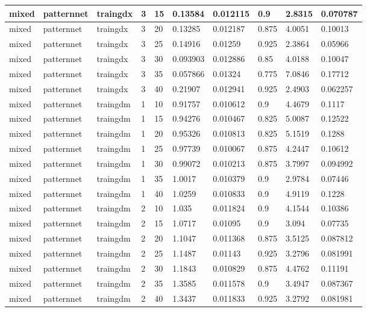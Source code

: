 \begin{longtable}{lllllllll}
mixed & patternnet & traingdx & 3 & 15 & 0.13584 & 0.012115 & 0.9 & 2.8315 & 0.070787 \\ \hline 
mixed & patternnet & traingdx & 3 & 20 & 0.13285 & 0.012187 & 0.875 & 4.0051 & 0.10013 \\ \hline 
mixed & patternnet & traingdx & 3 & 25 & 0.14916 & 0.01259 & 0.925 & 2.3864 & 0.05966 \\ \hline 
mixed & patternnet & traingdx & 3 & 30 & 0.093903 & 0.012886 & 0.85 & 4.0188 & 0.10047 \\ \hline 
mixed & patternnet & traingdx & 3 & 35 & 0.057866 & 0.01324 & 0.775 & 7.0846 & 0.17712 \\ \hline 
mixed & patternnet & traingdx & 3 & 40 & 0.21907 & 0.012941 & 0.925 & 2.4903 & 0.062257 \\ \hline 
mixed & patternnet & traingdm & 1 & 10 & 0.91757 & 0.010612 & 0.9 & 4.4679 & 0.1117 \\ \hline 
mixed & patternnet & traingdm & 1 & 15 & 0.94276 & 0.010467 & 0.825 & 5.0087 & 0.12522 \\ \hline 
mixed & patternnet & traingdm & 1 & 20 & 0.95326 & 0.010813 & 0.825 & 5.1519 & 0.1288 \\ \hline 
mixed & patternnet & traingdm & 1 & 25 & 0.97739 & 0.010067 & 0.875 & 4.2447 & 0.10612 \\ \hline 
mixed & patternnet & traingdm & 1 & 30 & 0.99072 & 0.010213 & 0.875 & 3.7997 & 0.094992 \\ \hline 
mixed & patternnet & traingdm & 1 & 35 & 1.0017 & 0.010379 & 0.9 & 2.9784 & 0.07446 \\ \hline 
mixed & patternnet & traingdm & 1 & 40 & 1.0259 & 0.010833 & 0.9 & 4.9119 & 0.1228 \\ \hline 
mixed & patternnet & traingdm & 2 & 10 & 1.035 & 0.011824 & 0.9 & 4.1544 & 0.10386 \\ \hline 
mixed & patternnet & traingdm & 2 & 15 & 1.0717 & 0.01095 & 0.9 & 3.094 & 0.07735 \\ \hline 
mixed & patternnet & traingdm & 2 & 20 & 1.1047 & 0.011368 & 0.875 & 3.5125 & 0.087812 \\ \hline 
mixed & patternnet & traingdm & 2 & 25 & 1.1487 & 0.01143 & 0.925 & 3.2796 & 0.081991 \\ \hline 
mixed & patternnet & traingdm & 2 & 30 & 1.1843 & 0.010829 & 0.875 & 4.4762 & 0.11191 \\ \hline 
mixed & patternnet & traingdm & 2 & 35 & 1.3585 & 0.011578 & 0.9 & 3.4947 & 0.087367 \\ \hline 
mixed & patternnet & traingdm & 2 & 40 & 1.3437 & 0.011833 & 0.925 & 3.2792 & 0.081981 \\ \hline 

\end{longtable}
